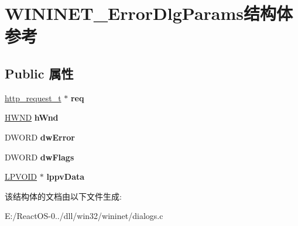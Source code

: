 \hypertarget{struct_w_i_n_i_n_e_t___error_dlg_params}{}\section{W\+I\+N\+I\+N\+E\+T\+\_\+\+Error\+Dlg\+Params结构体 参考}
\label{struct_w_i_n_i_n_e_t___error_dlg_params}
\subsection*{Public 属性}
\begin{DoxyCompactItemize}
\item 
\mbox{\label{struct_w_i_n_i_n_e_t___error_dlg_params_a689016f4543d479d1e0d0cb14efd9b16}} 
\hyperlink{structhttp__request__t}{http\+\_\+request\+\_\+t} $\ast$ {\bfseries req}
\item 
\mbox{\label{struct_w_i_n_i_n_e_t___error_dlg_params_a53fda48a27e24aa4fa5aeb839a36ec64}} 
\hyperlink{interfacevoid}{H\+W\+ND} {\bfseries h\+Wnd}
\item 
\mbox{\label{struct_w_i_n_i_n_e_t___error_dlg_params_a806fe924a99305d969ab1427dac58356}} 
D\+W\+O\+RD {\bfseries dw\+Error}
\item 
\mbox{\label{struct_w_i_n_i_n_e_t___error_dlg_params_af8ec6217da41d603073262c41020365d}} 
D\+W\+O\+RD {\bfseries dw\+Flags}
\item 
\mbox{\label{struct_w_i_n_i_n_e_t___error_dlg_params_ab32d04ad18ab867e1e897c858f09024a}} 
\hyperlink{interfacevoid}{L\+P\+V\+O\+ID} $\ast$ {\bfseries lppv\+Data}
\end{DoxyCompactItemize}


该结构体的文档由以下文件生成\+:\begin{DoxyCompactItemize}
\item 
E\+:/\+React\+O\+S-\/0../dll/win32/wininet/dialogs.\+c\end{DoxyCompactItemize}
